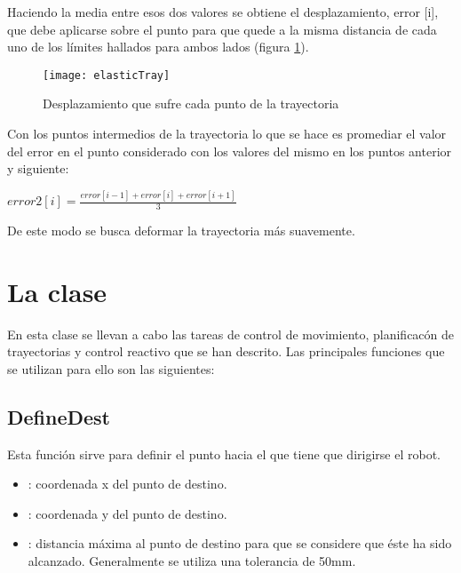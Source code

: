 Haciendo la media entre esos dos valores se obtiene el desplazamiento, error [i], que debe aplicarse sobre el punto para que quede a la misma distancia de cada uno de los límites hallados para ambos lados (figura \ref{fg:elasticTray}).

\begin{figure}[h]
  \centering\texttt{[image: elasticTray]}\\
  \caption{Desplazamiento que sufre cada punto de la trayectoria}\label{fg:elasticTray}
\end{figure}

Con los puntos intermedios de la trayectoria lo que se hace es promediar el valor del error en el punto considerado con los valores del mismo en los puntos anterior y siguiente:

\begin{center}
$error2[i] = \frac{error[i-1] + error[i] + error[i+1]}{3}$
\end{center}

\noindent
De este modo se busca deformar la trayectoria más suavemente.

\section{La clase }
En esta clase se llevan a cabo las tareas de control de movimiento, planificacón de trayectorias y control reactivo que se han descrito. Las principales funciones que se utilizan para ello son las siguientes:

\subsection{DefineDest}

\noindent
{}

\noindent
Esta función sirve para definir el punto hacia el que tiene que dirigirse el robot.

\begin{itemize}
  \item {}: coordenada x del punto de destino.
  \item {}: coordenada y del punto de destino.
  \item {}: distancia máxima al punto de destino para que se considere que éste ha sido alcanzado. Generalmente se utiliza una tolerancia de 50mm.
\end{itemize}

